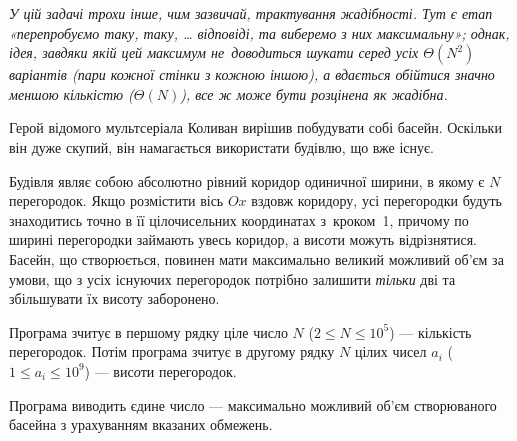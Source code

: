﻿{\it У цій задачі трохи інше, чим зазвичай, трактування жадібності. Тут є етап «перепробуємо таку, таку, \dots{} відповіді, та виберемо з них максимальну»; однак, ідея, завдяки якій цей максимум не~доводиться шукати серед усіх $\Theta(N^2)$ варіантів (пари кожної стінки з кожною іншою), а вдається обійтися значно меншою кількістю ($\Theta(N)$), все ж може бути розцінена як жадібна.}

Герой відомого мультсеріала Коливан вирішив побудувати собі басейн. Оскільки він дуже скупий, він намагається використати будівлю, що вже існує. 

Будівля являє собою абсолютно рівний коридор одиничної ширини, в якому є $N$ перегородок. Якщо розмістити вісь $Ox$ вздовж коридору, усі перегородки будуть знаходитись точно в її цілочисельних координатах з~кроком~1, причому по ширині перегородки займають увесь коридор, а вис{\it о}ти можуть відрізнятися. Басейн, що створюється, повинен мати максимально великий можливий об’єм за умови, що з усіх існуючих перегородок потрібно залишити {\it тільки} дві та збільшувати їх висоту заборонено.

\InputFile
Програма зчитує в першому рядку ціле число $N$ ($2\leqslant N\leqslant 10^5$) --- кількість перегородок. Потім програма зчитує в другому рядку $N$ цілих чисел $a_i$ ($1\leqslant a_i\leqslant 10^9$) --- вис{\it о}ти перегородок. 

\OutputFile
Програма виводить єдине число --- максимально можливий об’єм створюваного басейна з урахуванням вказаних обмежень. 

\Examples
\begin{example}
\end{example}
